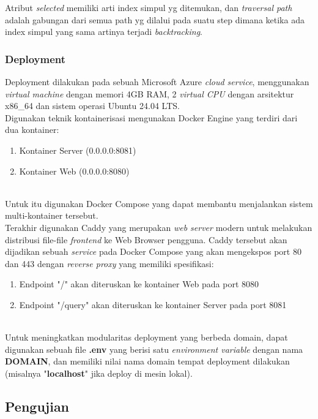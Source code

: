 \documentclass[12pt,a4paper]{article}
\begin{document}
\begin{itemize}
Atribut \textit{selected} memiliki arti index simpul yg ditemukan,
dan \textit{traversal path} adalah gabungan dari semua path yg dilalui pada suatu step dimana 
ketika ada index simpul yang sama artinya terjadi \textit{backtracking}. \\


\subsubsection{Deployment}

Deployment dilakukan pada sebuah Microsoft Azure \textit{cloud service}, menggunakan \textit{virtual machine} dengan memori 4GB RAM, 2 \textit{virtual CPU}
dengan arsitektur x86\_64 dan sistem operasi Ubuntu 24.04 LTS. \\

Digunakan teknik kontainerisasi mengunakan Docker Engine yang terdiri dari dua kontainer:
\begin{enumerate}
    \item Kontainer Server (0.0.0.0:8081)
    \item Kontainer Web (0.0.0.0:8080)
\end{enumerate} \\

Untuk itu digunakan Docker Compose yang dapat membantu menjalankan sistem multi-kontainer tersebut.  \\

Terakhir digunakan Caddy yang merupakan \textit{web server} modern untuk melakukan distribusi file-file \textit{frontend} ke Web Browser pengguna.
Caddy tersebut akan dijadikan sebuah \textit{service} pada Docker Compose yang akan mengekspos port 80 dan 443 dengan \textit{reverse proxy} yang memiliki spesifikasi:
\begin{enumerate}
    \item Endpoint "/" akan diteruskan ke kontainer Web pada port 8080
    \item Endpoint "/query" akan diteruskan ke kontainer Server pada port 8081
\end{enumerate} \\

Untuk meningkatkan modularitas deployment yang berbeda domain, dapat digunakan sebuah file \textbf{.env} yang berisi satu
\textit{environment variable} dengan nama \textbf{DOMAIN}, dan memiliki nilai nama domain tempat deployment dilakukan (misalnya "\textbf{localhost}" jika deploy di mesin lokal).


\subsection{Pengujian}


\end{itemize}
\end{document}
